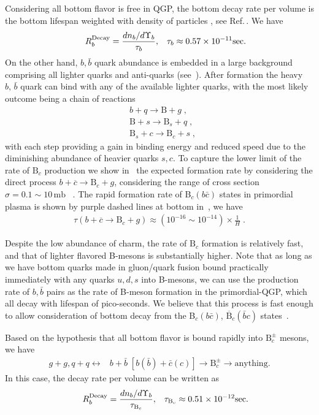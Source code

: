 Considering all bottom flavor is free in QGP, the bottom decay rate per volume is the bottom lifespan weighted with density of particles , see Ref.\,\cite{Kuznetsova:2008jt}. We have
\begin{align}\hspace{0.5cm}
R^{\mathrm{Decay}}_b=\frac{dn_b/d\Upsilon_b}{\tau_b},\,\,\,\,\, \tau_b\approx0.57\times10^{-11} \mathrm{sec}.
\end{align}
On the other hand, $b$,\,$\bar b$ quark abundance is embedded in a large background comprising all lighter quarks and anti-quarks (see~). After formation the heavy $b,\,\bar b$ quark can bind with any of the available lighter quarks, with the most likely outcome being a chain of reactions 
\begin{align}
&b+q\longrightarrow\mathrm{B}+g\;,\\
&\mathrm{B}+s\longrightarrow\mathrm{B}_s+q\;,\\
&\mathrm{B}_s+c\longrightarrow\mathrm{B}_c+s\;,
\end{align}
with each step providing a gain in binding energy and reduced speed due to the diminishing abundance of heavier quarks $s, c$. To capture the lower limit of the rate of $\mathrm{B}_c$ production we show in~ the expected formation rate by considering the direct process $b+\overline c\rightarrow \mathrm{B}_c+g$, considering the range of cross section $\sigma=0.1\sim10\,\mathrm{mb}$ ~\cite{Schroedter:2000ek}. The rapid formation rate of B$_c(b\bar c)$ states in primordial plasma is shown by purple dashed lines at bottom in~, we have
\begin{align}
\tau (b+\overline c\rightarrow \mathrm{B}_c+g)\approx(10^{-16}\sim10^{-14})\times\frac{1}{H} \;.
\end{align}

Despite the low abundance of charm, the rate of $\mathrm{B}_c$ formation is relatively fast, and that of lighter flavored B-mesons is substantially higher. Note that as long as we have bottom quarks made in gluon/quark fusion bound practically immediately with any quarks $u, d, s$ into B-mesons, we can use the production rate of $b, \bar b$ pairs as the rate of B-meson formation in the primordial-QGP, which all decay with lifespan of pico-seconds. We believe that this process is fast enough to allow consideration of bottom decay from the B$_c(b\bar c)$, $\overline{\mathrm{B}}_c(\bar b c)$ states~\cite{Yang:2020nne}. 
 
Based on the hypothesis that all bottom flavor is bound rapidly into $\mathrm{B}_c^\pm$ mesons, we have 
\begin{align}\label{Bc_source}
g+g, q+q \longleftrightarrow &b+\bar b\;[b(\bar{b})+\bar{c}(c)]\longrightarrow \mathrm{B}_c^\pm\longrightarrow\mathrm{anything}.
\end{align}
In this case, the decay rate per volume can be written as
\begin{align}\hspace{0.5cm}
 R^{\mathrm{Decay}}_b=\frac{dn_b/d\Upsilon_b}{\tau_{\mathrm{B}_c}},\,\,\,\,\, \tau_{\mathrm{B}_c}\approx0.51\times10^{-12} \mathrm{sec}.
 \end{align}


